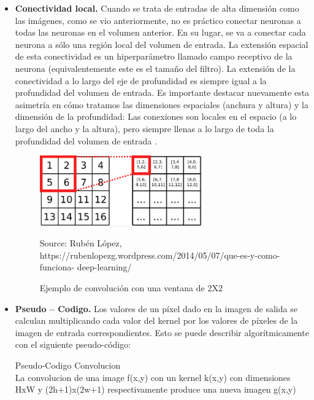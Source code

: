 \begin{itemize}
\item \textbf{Conectividad local.} Cuando se trata de entradas de alta dimensión como las
imágenes, como se vio anteriormente, no es práctico conectar neuronas a todas las
neuronas en el volumen anterior. En su lugar, se va a conectar cada neurona a sólo
una región local del volumen de entrada. La extensión espacial de esta
conectividad es un hiperparámetro llamado campo receptivo de la neurona
(equivalentemente este es el tamaño del filtro). La extensión de la conectividad a
lo largo del eje de profundidad es siempre igual a la profundidad del volumen de
entrada. Es importante destacar nuevamente esta asimetría en cómo tratamos las
dimensiones espaciales (anchura y altura) y la dimensión de la profundidad: Las
conexiones son locales en el espacio (a lo largo del ancho y la altura), pero siempre
llenas a lo largo de toda la profundidad del volumen de entrada \cite{22RedesNeuronalesConvolu}.


\begin{figure}[H]
		\centering
		\includegraphics[width=70mm]{./Imagenes/convolucion.png}
		\caption{Ejemplo de convolución con una ventana de 2X2}
		Source: Rubén López, https://rubenlopezg.wordpress.com/2014/05/07/que-es-y-como-funciona-
deep-learning/
        \label{fig:convolucion}
\end{figure}


\item { \textbf{Pseudo – Codigo.} Los valores de un píxel dado en la imagen de salida se calculan
multiplicando cada valor del kernel por los valores de píxeles de la imagen de
entrada correspondientes. Esto se puede describir algorítmicamente con el
siguiente pseudo-código:


\begin{algorithm}
\caption{Pseudo-Codigo Convolucion\\
La convolucion de una image f(x,y) con un kernel k(x,y) con dimensiones HxW y (2h+1)x(2w+1) respectivamente produce una nueva imagen g(x,y)}\label{alg:euclid}
\begin{algorithmic}[H]


\end{algorithmic}
\end{algorithm}}
\end{itemize}
